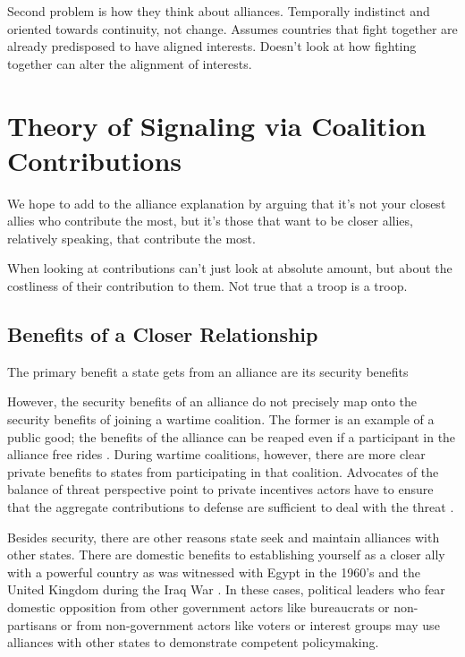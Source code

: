 \documentclass[12pt,letterpaper]{article}
\begin{document}
	Second problem is how they think about alliances. Temporally indistinct and oriented towards continuity, not change. Assumes countries that fight together are already predisposed to have aligned interests. Doesn't look at how fighting together can alter the alignment of interests.

\section{Theory of Signaling via Coalition Contributions}
	We hope to add to the alliance explanation by arguing that it's not your closest allies who contribute the most, but it's those that want to be closer allies, relatively speaking, that contribute the most.

	When looking at contributions can't just look at absolute amount, but about the costliness of their contribution to them. Not true that a troop is a troop.

	\subsection{Benefits of a Closer Relationship}
		The primary benefit a state gets from an alliance are its security benefits

		However, the security benefits of an alliance do not precisely map onto the security benefits of joining a wartime coalition. The former is an example of a public good; the benefits of the alliance can be reaped even if a participant in the alliance free rides \citep{olson_economictheoryalliances_1966}. During wartime coalitions, however, there are more clear private benefits to states from participating in that coalition. Advocates of the balance of threat perspective point to private incentives actors have to ensure that the aggregate contributions to defense are sufficient to deal with the threat \citep{bennett_friendsneedburden_1997a, baltrusaitis_coalitionpoliticsiraq_2010, davidson_neoclassicalrealistexplanation_2011}.

		Besides security, there are other reasons state seek and maintain alliances with other states. There are domestic benefits to establishing yourself as a closer ally with a powerful country as was witnessed with Egypt in the 1960's \citep{barnett_domesticsourcesalliances_1991} and the United Kingdom during the Iraq War \citep{davidson_americaallieswar_2011}. In these cases, political leaders who fear domestic opposition from other government actors like bureaucrats or non-partisans or from non-government actors like voters or interest groups may use alliances with other states to demonstrate competent policymaking.
\end{document}
